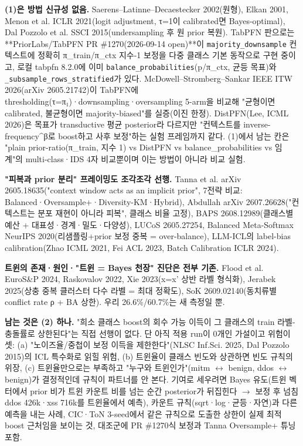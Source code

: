 \textbf{(1)은 방법 신규성 없음.} Saerens–Latinne–Decaestecker 2002(원형), Elkan 2001, Menon et al. ICLR 2021(logit adjustment, τ=\allowbreak{}1이 calibrated면 Bayes-optimal), Dal Pozzolo et al. SSCI 2015(undersampling 후 원 prior 복원). TabPFN 판으로는 **PriorLabs/\allowbreak{}TabPFN PR \#1270(2026-09-14 open)**이 \texttt{majority\allowbreak{}\_\allowbreak{}\allowbreak{}downsam\allowbreak{}ple} 컨텍스트에 정확히 π\_\allowbreak{}train/\allowbreak{}π\_\allowbreak{}ctx 지수-1 보정을 다중 클래스 기본 동작으로 구현 중이고, 로컬 tabpfn 8.2.0에 이미 \texttt{balance\_\allowbreak{}\allowbreak{}probabil\allowbreak{}ities}(p/\allowbreak{}π\_\allowbreak{}ctx, 균등 목표)와 \texttt{\_\allowbreak{}\allowbreak{}subsamp\allowbreak{}le\_\allowbreak{}\allowbreak{}rows\_\allowbreak{}\allowbreak{}stratifi\allowbreak{}ed}가 있다. McDowell–Stromberg–Sankar IEEE ITW 2026(arXiv 2605.21742)이 TabPFN에 thresholding(τ=\allowbreak{}π₁)·downsampling·oversampling 5-arm을 비교해 "균형이면 calibrated, 불균형이면 majority-biased"를 실증(이진 한정). DistPFN(Lee, ICML 2026)은 목표가 transductive 평균 posterior라 다르지만 "컨텍스트를 inverse-frequency\textasciicircum{}β로 boost하고 사후 보정"하는 실험 프레임까지 같다. (1)에서 남는 칸은 "plain prior-ratio(π\_\allowbreak{}train, 지수 1) vs DistPFN vs balance\_\allowbreak{}probabilities vs 임계"의 multi-class·IDS 4자 비교뿐이며 이는 방법이 아니라 비교 실험.

\textbf{"피복과 prior 분리" 프레이밍도 조각조각 선행.} Tanna et al. arXiv 2605.18635("context window acts as an implicit prior", 7전략 비교: Balanced·Oversample+\allowbreak{}·Diversity-KM·Hybrid), Abdullah arXiv 2607.26628("컨텍스트는 분포 재현이 아니라 피복", 클래스 비율 고정), BAPS 2608.12989(클래스별 예산 +\allowbreak{} 대표성·경계·밀도·다양성), LUCoS 2605.27254, Balanced Meta-Softmax NeurIPS 2020(리샘플링+\allowbreak{}prior 보정 중복 =\allowbreak{} over-balance), LLM-ICL의 label-bias calibration(Zhao ICML 2021, Fei ACL 2023, Batch Calibration ICLR 2024).

\textbf{트윈의 존재·원인·"트윈 =\allowbreak{} Bayes 천장" 진단은 전부 기존.} Flood et al. EuroS\&P 2024, Raskovalov 2022, Xie 2023(x=\allowbreak{}x' 상반 라벨 형식화), Jerabek 2025(상충 중복 클러스터 다수 라벨 =\allowbreak{} 최대 정확도), SoK 2609.02140(동치류별 conflict rate ρ +\allowbreak{} BA 상한). 우리 26.6\%/\allowbreak{}60.7\%는 새 측정일 뿐.

\textbf{남는 것은 (2) 하나.} "희소 클래스 boost의 회수 가능 이득이 그 클래스의 train 라벨-충돌률로 상한된다"는 직접 선행이 없다. 단 아직 적용 run이 0개인 가설이고 위험이 셋: (a) "노이즈율/\allowbreak{}중첩이 보정 이득을 제한한다"(NLSC Inf.Sci. 2025, Dal Pozzolo 2015)의 ICL 특수화로 읽힐 위험, (b) 트윈율이 클래스 빈도와 상관하면 빈도 규칙의 위장, (c) 트윈율만으로는 부족하고 "누구와 트윈인가"(mitm \ensuremath{\leftrightarrow} benign, ddos \ensuremath{\leftrightarrow} benign)가 결정적인데 규칙이 파트너를 안 본다. 기여로 세우려면 Bayes 유도(트윈 벡터에서 prior 비가 트윈 카운트 비를 넘는 순간 posterior가 뒤집힌다  \ensuremath{\rightarrow}  보정 후 넘침 ddos 426k·xss 716k를 트윈율에서 예측), 카운트 규칙(sqrt·log·균등·자연)과 다른 예측을 내는 사례, CIC·ToN 3-seed에서 같은 규칙으로 도출한 상한이 실제 최적 boost 근처임을 보이는 것, 대조군에 PR \#1270식 보정과 Tanna Oversample+\allowbreak{} 튜닝 포함.

